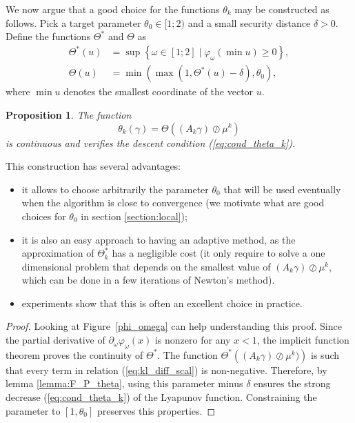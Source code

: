 \documentclass{article} %
\theoremstyle{plain}
\newtheorem{proposition}{Proposition}
\theoremstyle{definition}
\theoremstyle{remark}
\begin{document}
We now argue that a good choice for the functions $\theta_k$ may be constructed as follows. Pick a target parameter $\theta_0 \in [1;2)$ and a small security distance $\delta>0$. Define the functions $\Theta^*$ and $\Theta$ as
	\begin{align}
	\label{eq:Theta_opt}
	\Theta^*(u) &= \sup \left\{\omega \in [1;2]  \mid \varphi_\omega\left(\min u\right) \ge 0 \right\} ,\\
	\label{eq:Theta}
	\Theta(u) &= \min(\max(1,\Theta^*(u)-\delta),\theta_0),
	\end{align}
	where $\min u$ denotes the smallest coordinate of the vector $u$. 

\begin{proposition}\label{prop:thetachoice}
	The function
	\begin{equation}
	\label{eq:theta_k}
	\theta_k(\gamma) =\Theta\left ((A_k \gamma)\oslash \mu^k\right)
	\end{equation}
	is continuous and verifies the descent condition (\ref{eq:cond_theta_k}).
\end{proposition}
This construction has several advantages:
\begin{itemize}
\item it allows to choose arbitrarily the parameter $\theta_0$ that will be used eventually when the algorithm is close to convergence (we motivate what are good choices for $\theta_0$ in section \ref{section:local});
\item it is also an easy approach to having an adaptive method, as the approximation of $\Theta_k^*$ has a negligible cost (it only require to solve a one dimensional problem that depends on the smallest value of $(A_k \gamma)\oslash \mu^k$, which can be done in a few iterations of Newton's method).
\item experiments show that this is often an excellent choice in practice.
\end{itemize}

\begin{proof}
Looking at Figure~\ref{phi_omega} can help understanding this proof.	Since the partial derivative of $\partial_\omega \varphi_\omega(x)$ is nonzero for any $x<1$, the implicit function theorem proves the continuity of $\Theta^*$.
	The function $\Theta^*\left((A_k \gamma)\oslash \mu^k)\right)$ is such that every term in relation (\ref{eq:kl_diff_scal}) is non-negative.
	Therefore, by lemma \ref{lemma:F_P_theta}, using this parameter minus $\delta$ ensures the strong decrease (\ref{eq:cond_theta_k}) of the Lyapunov function.
	Constraining the parameter to $[1,\theta_0]$ preserves this properties.%
\end{proof}
\end{document}
